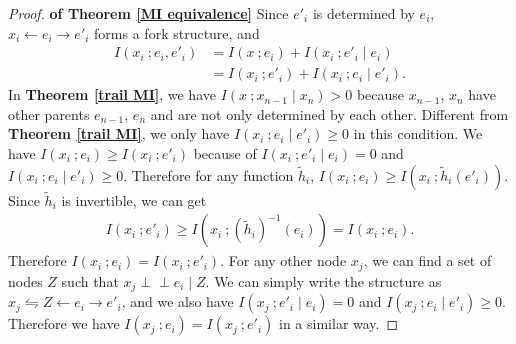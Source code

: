 \documentclass[twoside,11pt]{article}
\begin{document}
\begin{proof}{\textbf{of Theorem \ref{MI equivalence}}}
Since $e'_i$ is determined by $e_i$, $x_i\gets e_i \to e'_i$ forms a fork structure, and
\begin{align*}
I(x_i\ ;e_i,e'_i)&=I(x\ ;e_i)+I(x_i\ ;e'_i\mid e_i)\\
&=I(x_i\ ;e'_i)+I(x_i\ ;e_i\mid e'_i).
\end{align*}
In \textbf{Theorem \ref{trail MI}}, we have $I(x\ ;x_{n-1}\mid x_n)>0$ because $x_{n-1}$, $x_{n}$ have other parents $e_{n-1}$, $e_n$ and are not only determined by each other. Different from \textbf{Theorem \ref{trail MI}}, we only have $I(x_i\ ;e_i\mid e'_i)\geq 0$ in this condition.
We have $I(x_i\ ;e_i)\geq I(x_i\ ;e'_i)$ because of $I(x_i\ ;e'_i\mid e_i)=0$ and $I(x_i\ ;e_i\mid e'_i)\geq 0$. Therefore for any function $\tilde h_i$, $I(x_i\ ;e_i)\geq I(x_i\ ;\tilde h_i(e'_i))$. Since $\tilde h_i$ is invertible, we can get 
\begin{align*}
I(x_i\ ;e'_i)\geq I(x_i\ ;(\tilde h_i)^{-1}(e_i))=I(x_i\ ;e_i).
\end{align*}
Therefore $I(x_i\ ;e_i)= I(x_i\ ;e'_i)$. For any other node $x_j$, we can find a set of nodes $Z$ such that $x_j\perp\!\!\!\perp e_i\mid Z$. We can simply write the structure as $x_j\leftrightharpoons Z\gets e_i\to e'_i$, and we also have $I(x_j\ ;e'_i\mid e_i)=0$ and $I(x_j\ ;e_i\mid e'_i)\geq 0$. Therefore we have $I(x_j\ ;e_i)= I(x_j\ ;e'_i)$ in a similar way.

\end{proof}
\end{document}
